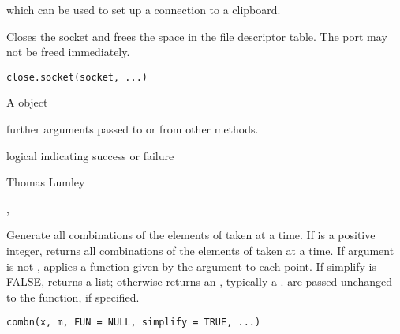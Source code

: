 %
\begin{SeeAlso}\relax
{} which can be used to set up a connection to a clipboard.
\end{SeeAlso}
%
\begin{Description}\relax
Closes the socket and frees the space in the file descriptor table.  The
port may not be freed immediately.
\end{Description}
%
\begin{Usage}
\begin{verbatim}
close.socket(socket, ...)
\end{verbatim}
\end{Usage}
%
\begin{Arguments}
\begin{ldescription}
\item[\code{socket}] A  object
\item[\code{...}] further arguments passed to or from other methods.
\end{ldescription}
\end{Arguments}
%
\begin{Value}
logical indicating success or failure
\end{Value}
%
\begin{Author}\relax
Thomas Lumley
\end{Author}
%
\begin{SeeAlso}\relax
{}, 
\end{SeeAlso}
%
\begin{Description}\relax
Generate all combinations of the elements of  taken 
at a time.  If  is a positive integer, returns all
combinations of the elements of  taken  at a
time.  If argument  is not , applies a function given
by the argument to each point.  If simplify is FALSE,  returns
a list; otherwise returns an , typically a
.   are passed unchanged to the
 function, if specified.
\end{Description}
%
\begin{Usage}
\begin{verbatim}
combn(x, m, FUN = NULL, simplify = TRUE, ...)
\end{verbatim}
\end{Usage}

